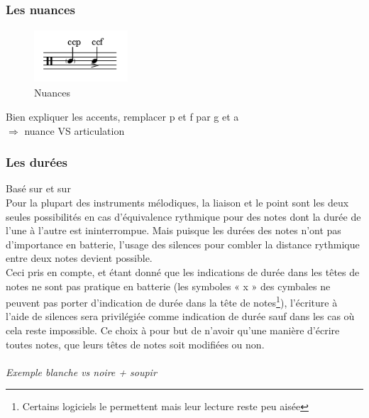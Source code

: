 \subsubsection{Les nuances}
\begin{figure}[h]
\includegraphics[height=20mm, width=35mm]{z_images/1_description_notation/nuances.png}
\caption{Nuances}
\end{figure}
Bien expliquer les accents, remplacer p et f par g et a\\
$\Rightarrow$ nuance VS articulation\

\subsubsection{Les durées}
Basé sur \cite{jacquemard:hal-01134096} et sur \cite{jacquemard:hal-01403982}\\
Pour la plupart des instruments mélodiques, la liaison et le point sont les deux seules possibilités en cas d’équivalence rythmique pour des notes dont la durée de l’une à l’autre est ininterrompue. Mais puisque les durées des notes n’ont pas d’importance en batterie, l’usage des silences pour combler la distance rythmique entre deux notes devient possible.\\
Ceci pris en compte, et étant donné que les indications de durée dans les têtes de notes ne sont pas pratique en batterie (les symboles « x » des cymbales ne
peuvent pas porter d’indication de durée dans la tête de notes\footnote{Certains logiciels le permettent mais leur lecture reste peu aisée}), l’écriture à l’aide de silences sera privilégiée comme indication de durée sauf dans les cas où cela reste impossible. Ce choix à pour but de n’avoir qu’une manière d’écrire toutes notes, que leurs têtes de notes soit modifiées ou non.\\\\
\textit{Exemple blanche vs noire + soupir}\\

